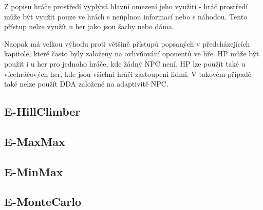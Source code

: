 Z popisu hráče prostředí vyplývá hlavní omezení jeho využití - hráč prostředí může být využit pouze ve hrách s neúplnou informací nebo s náhodou. Tento přístup nelze využít u her jako jsou šachy nebo dáma.

Naopak má velkou výhodu proti většině přístupů popsaných v předcházejících kapitole, které často byly založeny na ovlivňování oponentů ve hře. HP může být použit i u her pro jednoho hráče, kde žádný NPC není. HP lze použít také u vícehráčových her, kde jsou všichni hráči zastoupeni lidmi. V takovém případě také nelze použít DDA založené na adaptivitě NPC.

\subsection{E-HillClimber}

\subsection{E-MaxMax}

\subsection{E-MinMax}

\subsection{E-MonteCarlo}

\endinput
